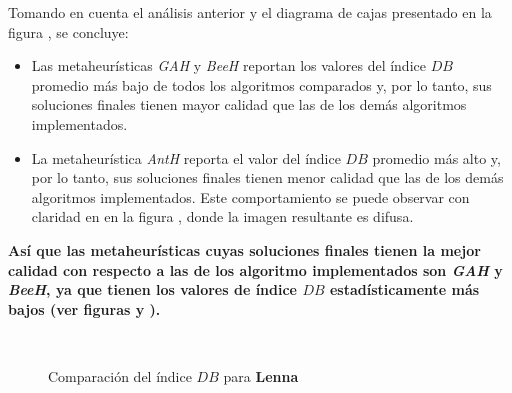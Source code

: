     Tomando en cuenta el análisis anterior y el diagrama de cajas presentado en
la figura , se concluye:
\begin{itemize}
    \item Las metaheurísticas \emph{GAH} y \emph{BeeH} reportan los valores del
índice $DB$ promedio más bajo de todos los algoritmos comparados y, por lo tanto,
sus soluciones finales tienen mayor calidad que las de los demás algoritmos
implementados.
    \item La metaheurística \emph{AntH} reporta el valor del índice $DB$ promedio
más alto y, por lo tanto, sus soluciones finales tienen menor calidad que las de
los demás algoritmos implementados. Este comportamiento se puede observar con
claridad en en la figura , donde la imagen resultante
es difusa.
\end{itemize}

    \textbf{Así que las metaheurísticas cuyas soluciones finales tienen la mejor
calidad con respecto a las de los algoritmo implementados son \emph{GAH} y
\emph{BeeH}, ya que tienen los valores de índice $DB$ estadísticamente más bajos
(ver figuras  y ).}

\begin{figure}[h!]
  \centering
  \\
  \caption{Comparación del índice $DB$ para \textbf{Lenna}}
  \label{fig:alg_comp_lenna}
\end{figure}

